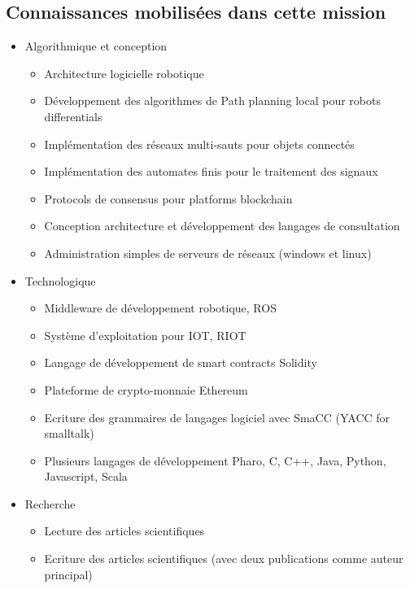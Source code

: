 \documentclass{resume} %
\begin{document}
	\subsection {Connaissances mobilisées dans cette mission }
	\begin{itemize} 				
			\item Algorithmique et conception 
					\begin{itemize}
						\item Architecture logicielle robotique 
						\item Développement des algorithmes de Path planning local pour robots differentials 
						\item Implémentation des réseaux  multi-sauts pour objets connectés 
						\item Implémentation des automates finis pour le traitement des signaux
						\item Protocols de consensus pour platforms blockchain 
						\item Conception architecture et développement des langages de consultation 
						\item Administration simples de serveurs de réseaux (windows et linux)
					\end {itemize}
			\item Technologique
					\begin{itemize}
						\item Middleware de développement robotique, ROS 
						\item Système d'exploitation pour IOT, RIOT 
						\item Langage de développement de smart contracts Solidity 
						\item Plateforme de crypto-monnaie Ethereum
						\item Ecriture des grammaires de langages logiciel avec SmaCC (YACC for smalltalk) 
						\item Plusieurs langages de développement Pharo, C, C++, Java, Python, Javascript, Scala
					\end {itemize}
			\item  Recherche 
				\begin{itemize}
						\item Lecture des articles scientifiques 
						\item Ecriture des articles scientifiques (avec deux publications comme auteur principal) 
				\end {itemize}
		\end{itemize}
		


		
\end{document}
